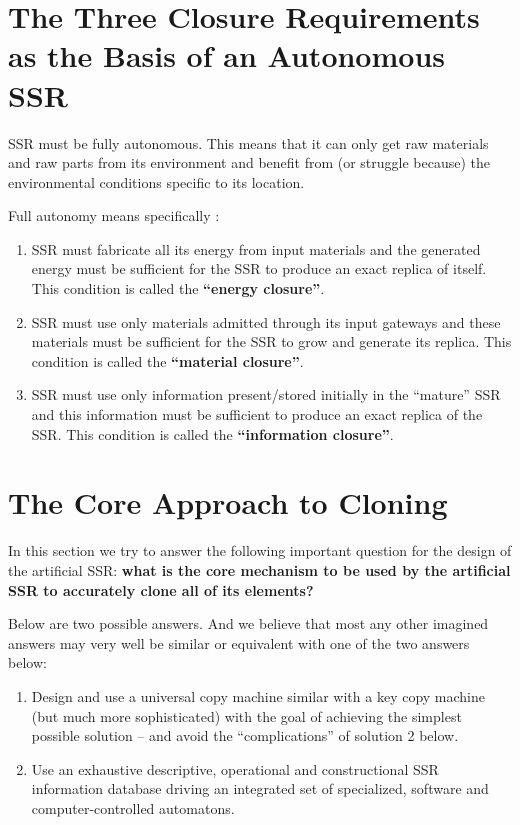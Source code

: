
\section{The Three Closure Requirements as the Basis of an Autonomous SSR}

SSR must be fully autonomous. This means that it can only get raw
materials and raw parts from its environment and benefit from (or
struggle because) the environmental conditions specific to its
location.

Full autonomy means specifically :

\begin{enumerate}
\item SSR must fabricate all its energy from input materials and the
generated energy must be sufficient for the SSR to produce an exact
replica of itself. This condition is called the \textbf{“energy
closure”}. 
\item SSR must use only materials admitted through its input gateways
and these materials must be sufficient for the SSR to grow and generate
its replica. This condition is called the \textbf{“material closure”}. 
\item SSR must use only information present/stored initially in the
“mature” SSR and this information must be sufficient to produce an
exact replica of the SSR. This condition is called the
\textbf{“information closure”}.
\end{enumerate}

\section{The Core Approach to Cloning}

In this section we try to answer the following important question for
the design of the artificial SSR: \textbf{what is the core mechanism to
be used by the artificial SSR to accurately clone all of its elements?}

Below are two possible answers. And we believe that most any other
imagined answers may very well be similar or equivalent with one of the
two answers below:

\begin{enumerate}
\item Design and use a universal copy machine similar with a key copy
machine (but much more sophisticated) with the goal of achieving the
simplest possible solution – and avoid the “complications” of solution
2 below.
\item Use an exhaustive descriptive, operational and constructional SSR
information database driving an integrated set of specialized, software
and computer-controlled automatons.
\end{enumerate}

